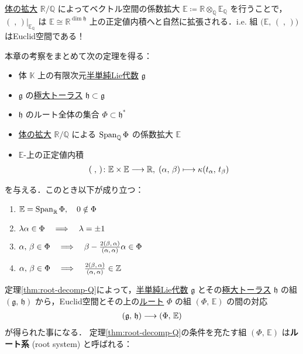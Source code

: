 \documentclass[rep_main]{subfiles}
\begin{document}
\hyperref[def:field-extention]{体の拡大} $\mathbb{R}/\mathbb{Q}$ によってベクトル空間の係数拡大 $\mathbb{E} \coloneqq \mathbb{R} \otimes_{\mathbb{Q}} \mathbb{E}_{\mathbb{Q}}$ を行うことで，$(\;,\, )|_{\mathbb{E}_{\mathbb{Q}}}$ は $\mathbb{E} \cong \mathbb{R}^{\dim \mathfrak{h}}$ 上の正定値内積へと自然に拡張される．i.e. 組 $\bigl(\mathbb{E},\, (\;,\, )\bigr)$ はEuclid空間である！

本章の考察をまとめて次の定理を得る：

\begin{mytheo}[label=thm:root-decomp-Q,breakable]{}
	\begin{itemize}
		\item 体 $\mathbb{K}$ 上の有限次元\hyperref[def:semisimple-LieAlg]{半単純Lie代数} $\mathfrak{g}$
		\item $\mathfrak{g}$ の\hyperref[def:toral-subLieAlg]{極大トーラス} $\mathfrak{h} \subset \mathfrak{g}$
		\item $\mathfrak{h}$ のルート全体の集合 $\Phi \subset \mathfrak{h}^*$ 
		\item \hyperref[def:field-extention]{体の拡大} $\mathbb{R}/\mathbb{Q}$ による $\operatorname{Span}_{\mathbb{Q}}\Phi$ の係数拡大 $\mathbb{E}$
		\item $\mathbb{E}$-上の正定値内積
		\begin{align}
			(\; ,\, ) \colon \mathbb{E} \times \mathbb{E} \longrightarrow \mathbb{R},\; (\alpha,\, \beta) \longmapsto \kappa(t_\alpha,\, t_\beta)
		\end{align}
	\end{itemize}
	を与える．このとき以下が成り立つ：
	\begin{enumerate}
		\item $\mathbb{E} = \operatorname{Span}_{\mathbb{R}}\Phi,\quad 0 \notin \Phi$
		\item $\lambda \alpha \in \Phi \quad \Longrightarrow \quad \lambda = \pm 1$
		\item $\alpha,\, \beta \in \Phi \quad \Longrightarrow \quad \beta - \frac{2(\beta,\, \alpha)}{(\alpha,\, \alpha)} \alpha \in \Phi$
		\item $\alpha,\, \beta \in \Phi \quad \Longrightarrow \quad \frac{2(\beta,\, \alpha)}{(\alpha,\, \alpha)} \in \mathbb{Z}$
	\end{enumerate}
\end{mytheo}

定理\ref{thm:root-decomp-Q}によって，\hyperref[def:semisimple-LieAlg]{半単純Lie代数} $\mathfrak{g}$ とその\hyperref[def:toral-subLieAlg]{極大トーラス} $\mathfrak{h}$ の組 $(\mathfrak{g},\, \mathfrak{h})$ 
から，Euclid空間とその上の\hyperref[eq:root-decomp1]{ルート} $\Phi$ の組 $(\Phi,\, \mathbb{E})$ の間の対応
\begin{align}
	(\mathfrak{g},\, \mathfrak{h}) \longrightarrow (\Phi,\, \mathbb{E})
\end{align}
が得られた事になる．
定理\ref{thm:root-decomp-Q}の条件を充たす組 $(\Phi,\, \mathbb{E})$ は\textbf{ルート系} (root system) と呼ばれる：
\end{document}
